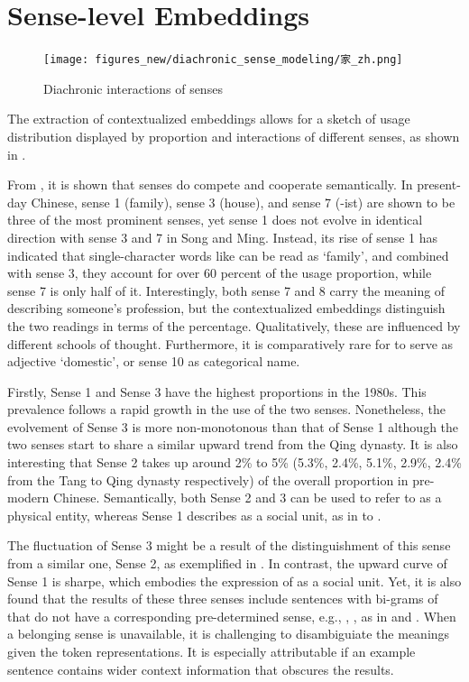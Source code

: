 \section{Sense-level Embeddings}

\begin{figure}[H]
  \centering
  \texttt{[image: figures\_new/diachronic\_sense\_modeling/家\_zh.png]}
  \caption{Diachronic interactions of senses}
  \label{fig:jia_polynomial}
\end{figure}

The extraction of contextualized embeddings allows for a sketch of usage distribution displayed by proportion and interactions of different senses, as shown in .

From , it is shown that senses do compete and cooperate semantically. In present-day Chinese, sense 1 (family), sense 3 (house), and sense 7 (-ist) are shown to be three of the most prominent senses, yet sense 1 does not evolve in identical direction with sense 3 and 7 in Song and Ming. Instead, its rise of sense 1 has indicated that single-character words like \jia can be read as `family', and combined with sense 3, they account for over 60 percent of the usage proportion, while sense 7 is only half of it. Interestingly, both sense 7 and 8 carry the meaning of describing someone's profession, but the contextualized embeddings distinguish the two readings in terms of the percentage. Qualitatively, these are influenced by different schools of thought. Furthermore, it is comparatively rare for \jia to serve as adjective `domestic', or sense 10 as categorical name.

Firstly, Sense 1 and Sense 3 have the highest proportions in the 1980s. This prevalence follows a rapid growth in the use of the two senses. Nonetheless, the evolvement of Sense 3 is more non-monotonous than that of Sense 1 although the two senses start to share a similar upward trend from the Qing dynasty. It is also interesting that Sense 2 takes up around 2\% to 5\% (5.3\%, 2.4\%, 5.1\%, 2.9\%, 2.4\% from the Tang to Qing dynasty respectively) of the overall proportion in pre-modern Chinese. Semantically, both Sense 2 and 3 can be used to refer to \jia as a physical entity, whereas Sense 1 describes \jia as a social unit, as in  to . 

The fluctuation of Sense 3 might be a result of the distinguishment of this sense from a similar one, Sense 2, as exemplified in .  In contrast, the upward curve of Sense 1 is sharpe, which embodies the expression of \jia as a social unit. Yet, it is also found that the results of these three senses include sentences with bi-grams of \jia that do not have a corresponding pre-determined sense, e.g., , , as in  and . When a belonging sense is unavailable, it is challenging to disambiguiate the meanings given the token representations. It is especially attributable if an example sentence contains wider context information that obscures the results.

